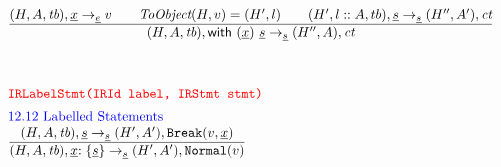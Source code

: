 \[\begin{array}{l@{~~}l@{~~}ll}
\frac{\begin{matrix}
\evale, \irid \rightarrow_{\ir\expr} v
\rulesep
\hf{ToObject}(H, v) = (H', l)
\rulesep
(H', l::A, tb), \ir\stmt \rightarrow_{\ir\stmt} (H'', A'), \ct
\end{matrix}}{\begin{matrix}
\state, \irwith \rightarrow_{\ir\stmt} (H'', A), \ct
\end{matrix}}
\\[4em]






\mtt{\normalsize\inred IRLabelStmt(IRId label, IRStmt stmt)}\\[.5em]
\mbox{\inblue 12.12 Labelled Statements}\\
\frac{\begin{matrix}
\state, \ir\stmt \rightarrow_{\ir\stmt} \resp, {\tt Break}(v, \ir{x})
\end{matrix}}{\begin{matrix}
\state, \irlab \rightarrow_{\ir\stmt} \resp, {\tt Normal}(v)
\end{matrix}}
\\[2em]


\end{array}\]
